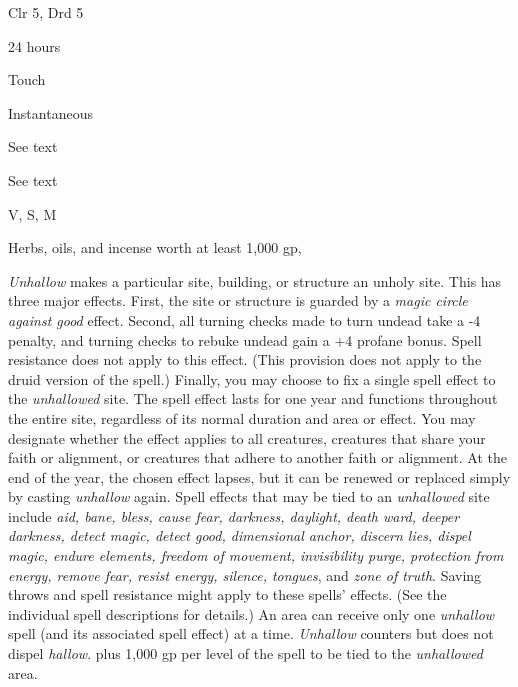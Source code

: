 
\begin{description*}
\item[Level:] Clr 5, Drd 5
\item[Casting Time:] 24 hours
\item[Range:] Touch
\item[Duration:] Instantaneous
\item[Saving Throw:] See text
\item[Spell Resistance:] See text
\item[Components:] V, S, M
\item[Arcane Material Component:] Herbs, oils, and incense worth at least 1,000 gp,
\end{description*}

\textit{Unhallow} makes a particular site, building, or structure an unholy site.
This has three major effects.
First, the site or structure is guarded by a \textit{magic circle against good
}effect.
Second, all turning checks made to turn undead take a -4 penalty, and turning checks
to rebuke undead gain a +4 profane bonus. Spell resistance does not apply to this
effect. (This provision does not apply to the druid version of the spell.)
Finally, you may choose to fix a single spell effect to the \textit{unhallowed
}site. The spell effect lasts for one year and functions throughout the entire
site, regardless of its normal duration and area or effect. You may designate whether
the effect applies to all creatures, creatures that share your faith or alignment,
or creatures that adhere to another faith or alignment. At the end of the year,
the chosen effect lapses, but it can be renewed or replaced simply by casting \textit{unhallow
}again.
Spell effects that may be tied to an \textit{unhallowed} site include \textit{aid,
bane, bless, cause fear, darkness, daylight, death ward, deeper darkness, detect
magic, detect good, dimensional anchor, discern lies, dispel magic, endure elements,
freedom of movement, invisibility purge, protection from energy, remove fear, resist
energy, silence, tongues}, and \textit{zone of truth}.
Saving throws and spell resistance might apply to these spells' effects. (See the
individual spell descriptions for details.)
An area can receive only one \textit{unhallow} spell (and its associated spell
effect) at a time.
\textit{Unhallow} counters but does not dispel \textit{hallow}.
plus 1,000 gp per level of the spell to be tied to the \textit{unhallowed} area.
